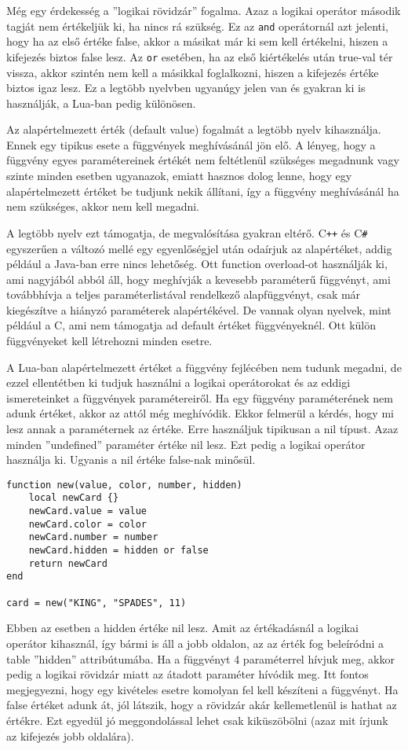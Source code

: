 Még egy érdekesség a ''logikai rövidzár'' fogalma. Azaz a logikai operátor második tagját nem értékeljük ki, ha nincs rá szükség. Ez az \verb|and| operátornál azt jelenti, hogy ha az első értéke false, akkor a másikat már ki sem kell értékelni, hiszen a kifejezés biztos false lesz. Az \verb|or| esetében, ha az első kiértékelés után true-val tér vissza, akkor szintén nem kell a másikkal foglalkozni, hiszen a kifejezés értéke biztos igaz lesz. Ez a legtöbb nyelvben ugyanúgy jelen van és gyakran ki is használják, a Lua-ban pedig különösen.

Az alapértelmezett érték (default value) fogalmát a legtöbb nyelv kihasználja. Ennek egy tipikus esete a függvények meghívásánál jön elő. A lényeg, hogy a függvény egyes paramétereinek értékét nem feltétlenül szükséges megadnunk vagy szinte minden esetben ugyanazok, emiatt hasznos dolog lenne, hogy egy alapértelmezett értéket be tudjunk nekik állítani, így a függvény meghívásánál ha nem szükséges, akkor nem kell megadni. 

A legtöbb nyelv ezt támogatja, de megvalósítása gyakran eltérő. C\verb|++| és C\verb|#| egyszerűen a változó mellé egy egyenlőségjel után odaírjuk az alapértéket, addig például a Java-ban erre nincs lehetőség. Ott function overload-ot használják ki, ami nagyjából abból áll, hogy meghívják a kevesebb paraméterű függvényt, ami továbbhívja a teljes paraméterlistával rendelkező alapfüggvényt, csak már kiegészítve a hiányzó paraméterek alapértékével. De vannak olyan nyelvek, mint például a C, ami nem támogatja ad default értéket függvényeknél. Ott külön függvényeket kell létrehozni minden esetre.

A Lua-ban alapértelmezett értéket a függvény fejlécében nem tudunk megadni, de ezzel ellentétben ki tudjuk használni a logikai operátorokat és az eddigi ismereteinket a függvények paramétereiről. Ha egy függvény paraméterének nem adunk értéket, akkor az attól még meghívódik. Ekkor felmerül a kérdés, hogy mi lesz annak a paraméternek az értéke. Erre használjuk tipikusan a nil típust. Azaz minden ''undefined'' paraméter értéke nil lesz. Ezt pedig a logikai operátor használja ki. Ugyanis a nil értéke false-nak minősül.
\scriptsize
\begin{lstlisting}
function new(value, color, number, hidden)
	local newCard {}
	newCard.value = value
	newCard.color = color
	newCard.number = number
	newCard.hidden = hidden or false
	return newCard
end

card = new("KING", "SPADES", 11)
\end{lstlisting}
\normalsize
Ebben az esetben a hidden értéke nil lesz. Amit az értékadásnál a logikai operátor kihasznál, így bármi is áll a jobb oldalon, az az érték fog beleíródni a table ''hidden'' attribútumába. Ha a függvényt 4 paraméterrel hívjuk meg, akkor pedig a logikai rövidzár miatt az átadott paraméter hívódik meg. Itt fontos megjegyezni, hogy egy kivételes esetre komolyan fel kell készíteni a függvényt. Ha false értéket adunk át, jól látszik, hogy a rövidzár akár kellemetlenül is hathat az értékre. Ezt egyedül jó meggondolással lehet csak kiküszöbölni (azaz mit írjunk az kifejezés jobb oldalára).

